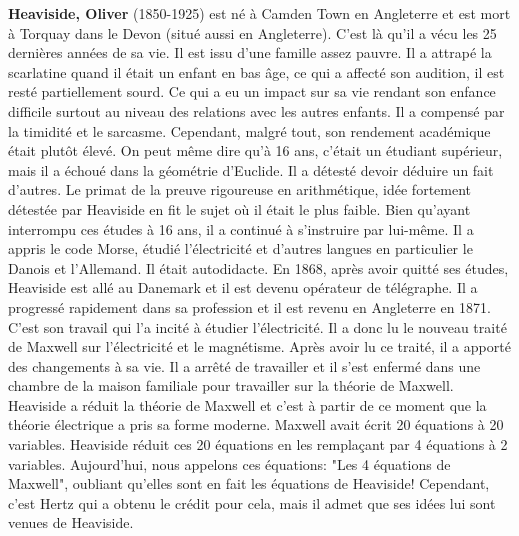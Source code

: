 \textbf{Heaviside, Oliver} (1850-1925) est né à Camden Town en Angleterre et est mort à Torquay dans le Devon (situé aussi en Angleterre). C'est là qu'il a vécu les 25 dernières années de sa vie. Il est issu d'une famille assez pauvre. Il a attrapé la scarlatine quand il était un enfant en bas âge, ce qui a affecté son audition, il est resté partiellement sourd. Ce qui a eu un impact sur sa vie rendant son enfance difficile surtout au niveau des relations avec les autres enfants. Il a compensé par la timidité et le sarcasme. Cependant, malgré tout, son rendement académique était plutôt élevé. On peut même dire qu'à 16 ans, c'était un étudiant supérieur, mais il a échoué dans la géométrie d'Euclide. Il a détesté devoir déduire un fait d'autres. Le primat de la preuve rigoureuse en arithmétique, idée fortement détestée par Heaviside en fit le sujet où il était le plus faible. Bien qu'ayant interrompu ces études à 16 ans, il a continué à s'instruire par lui-même. Il a appris le code Morse, étudié l'électricité et d'autres langues en particulier le Danois et l'Allemand. Il était autodidacte. En 1868, après avoir quitté ses études, Heaviside est allé au Danemark et il est devenu opérateur de télégraphe. Il a progressé rapidement dans sa profession et il est revenu en Angleterre en 1871. C'est son travail qui l'a incité à étudier l'électricité. Il a donc lu le nouveau traité de Maxwell sur l'électricité et le magnétisme. Après avoir lu ce traité, il a apporté des changements à sa vie.  Il a arrêté de travailler et il s'est enfermé dans une chambre de la maison familiale pour travailler sur la théorie de Maxwell. Heaviside a réduit la théorie de Maxwell et c'est à partir de ce moment que la théorie électrique a pris sa forme moderne. Maxwell avait écrit 20 équations à 20 variables. Heaviside réduit ces 20 équations en les remplaçant par 4 équations à 2 variables. Aujourd'hui, nous appelons ces équations: "Les 4 équations de Maxwell", oubliant qu'elles sont en fait les équations de Heaviside! Cependant, c'est Hertz qui a obtenu le crédit pour cela, mais il admet que ses idées lui sont venues de Heaviside.

